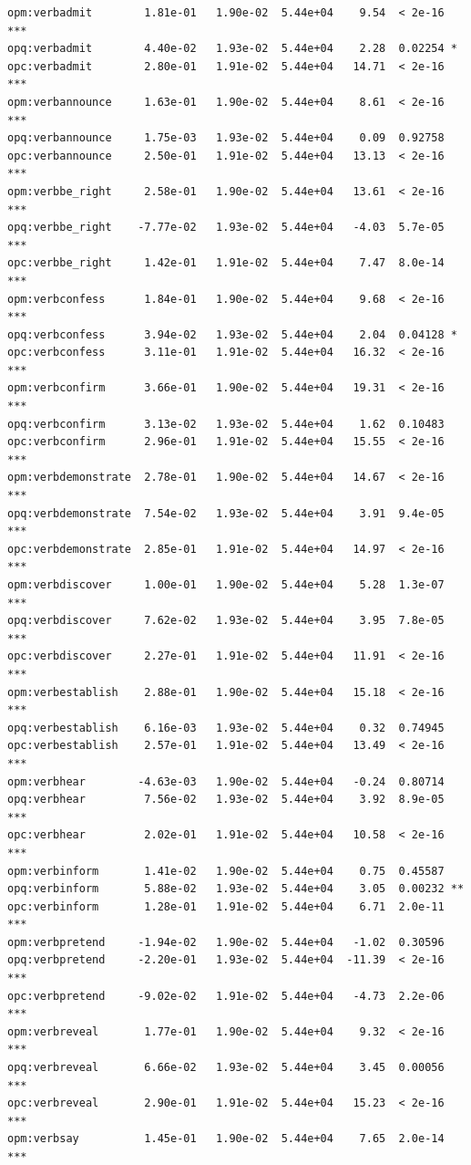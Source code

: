 \documentclass[10pt]{article}\usepackage[]{graphicx}\usepackage[dvipsnames]{xcolor}
\makeatletter
\newenvironment{kframe}{%
 \def\at@end@of@kframe{}%
 \ifinner\ifhmode%
  \def\at@end@of@kframe{\end{minipage}}%
  \begin{minipage}{\columnwidth}%
 \fi\fi%
 \def\FrameCommand##1{\hskip\@totalleftmargin \hskip-\fboxsep
 \colorbox{shadecolor}{##1}\hskip-\fboxsep
     \hskip-\linewidth \hskip-\@totalleftmargin \hskip\columnwidth}%
 \MakeFramed {\advance\hsize-\width
   \@totalleftmargin\z@ \linewidth\hsize
   \@setminipage}}%
 {\par\unskip\endMakeFramed%
 \at@end@of@kframe}
\newenvironment{knitrout}{}{} %
\makeatother
\begin{document}
\begin{knitrout}
\begin{kframe}
\begin{verbatim}
opm:verbadmit        1.81e-01   1.90e-02  5.44e+04    9.54  < 2e-16 ***
opq:verbadmit        4.40e-02   1.93e-02  5.44e+04    2.28  0.02254 *  
opc:verbadmit        2.80e-01   1.91e-02  5.44e+04   14.71  < 2e-16 ***
opm:verbannounce     1.63e-01   1.90e-02  5.44e+04    8.61  < 2e-16 ***
opq:verbannounce     1.75e-03   1.93e-02  5.44e+04    0.09  0.92758    
opc:verbannounce     2.50e-01   1.91e-02  5.44e+04   13.13  < 2e-16 ***
opm:verbbe_right     2.58e-01   1.90e-02  5.44e+04   13.61  < 2e-16 ***
opq:verbbe_right    -7.77e-02   1.93e-02  5.44e+04   -4.03  5.7e-05 ***
opc:verbbe_right     1.42e-01   1.91e-02  5.44e+04    7.47  8.0e-14 ***
opm:verbconfess      1.84e-01   1.90e-02  5.44e+04    9.68  < 2e-16 ***
opq:verbconfess      3.94e-02   1.93e-02  5.44e+04    2.04  0.04128 *  
opc:verbconfess      3.11e-01   1.91e-02  5.44e+04   16.32  < 2e-16 ***
opm:verbconfirm      3.66e-01   1.90e-02  5.44e+04   19.31  < 2e-16 ***
opq:verbconfirm      3.13e-02   1.93e-02  5.44e+04    1.62  0.10483    
opc:verbconfirm      2.96e-01   1.91e-02  5.44e+04   15.55  < 2e-16 ***
opm:verbdemonstrate  2.78e-01   1.90e-02  5.44e+04   14.67  < 2e-16 ***
opq:verbdemonstrate  7.54e-02   1.93e-02  5.44e+04    3.91  9.4e-05 ***
opc:verbdemonstrate  2.85e-01   1.91e-02  5.44e+04   14.97  < 2e-16 ***
opm:verbdiscover     1.00e-01   1.90e-02  5.44e+04    5.28  1.3e-07 ***
opq:verbdiscover     7.62e-02   1.93e-02  5.44e+04    3.95  7.8e-05 ***
opc:verbdiscover     2.27e-01   1.91e-02  5.44e+04   11.91  < 2e-16 ***
opm:verbestablish    2.88e-01   1.90e-02  5.44e+04   15.18  < 2e-16 ***
opq:verbestablish    6.16e-03   1.93e-02  5.44e+04    0.32  0.74945    
opc:verbestablish    2.57e-01   1.91e-02  5.44e+04   13.49  < 2e-16 ***
opm:verbhear        -4.63e-03   1.90e-02  5.44e+04   -0.24  0.80714    
opq:verbhear         7.56e-02   1.93e-02  5.44e+04    3.92  8.9e-05 ***
opc:verbhear         2.02e-01   1.91e-02  5.44e+04   10.58  < 2e-16 ***
opm:verbinform       1.41e-02   1.90e-02  5.44e+04    0.75  0.45587    
opq:verbinform       5.88e-02   1.93e-02  5.44e+04    3.05  0.00232 ** 
opc:verbinform       1.28e-01   1.91e-02  5.44e+04    6.71  2.0e-11 ***
opm:verbpretend     -1.94e-02   1.90e-02  5.44e+04   -1.02  0.30596    
opq:verbpretend     -2.20e-01   1.93e-02  5.44e+04  -11.39  < 2e-16 ***
opc:verbpretend     -9.02e-02   1.91e-02  5.44e+04   -4.73  2.2e-06 ***
opm:verbreveal       1.77e-01   1.90e-02  5.44e+04    9.32  < 2e-16 ***
opq:verbreveal       6.66e-02   1.93e-02  5.44e+04    3.45  0.00056 ***
opc:verbreveal       2.90e-01   1.91e-02  5.44e+04   15.23  < 2e-16 ***
opm:verbsay          1.45e-01   1.90e-02  5.44e+04    7.65  2.0e-14 ***

\end{verbatim}
\end{kframe}
\end{knitrout}
\end{document}
